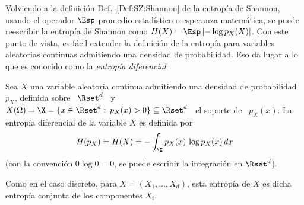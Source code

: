 
\label{Ssec:SZ:Diferencial}

Volviendo  a  la  definici\'on  Def.~\ref{Def:SZ:Shannon} de  la  entrop\'ia  de
Shannon,  usando   el  operador   $\Esp$  promedio  estad\'istico   o  esperanza
matem\'atica,  se  puede  reescribir  la  entrop\'ia de  Shannon  como  $H(X)  =
\Esp\left[ - \log p_X(X) \right]$.  Con este punto de vista, es f\'acil extender
la definici\'on de la  entrop\'ia para variables aleatorias continuas admitiendo
una densidad de  probabilidad.  Eso da lugar  a lo que es conocido  como la {\it
  entrop\'ia diferencial}:

\begin{definicion}\label{Def:SZ:EntropiaDiferencial}
  Sea  $X$   una  variable  aleatoria   continua  admitiendo  una   densidad  de
  probabilidad \ $p_X$, definida sobre \ $\Rset^d$  \ y \ $X(\Omega) = \X = \{ x
  \in  \Rset^d:  \:  p_X(x)  >  0  \}  \subseteq \Rset^d$  \  el  soporte  de  \
  $p_X(x)$. La entrop\'ia diferencial de la variable $X$ es definida por
  \[
  H(p_X) = H(X) = - \int_\X p_X(x) \, \log p_X(x) \, dx
  \]
  (con la  convenci\'on $0 \log  0 = 0$,  se puede escribir la  integraci\'on en
  $\Rset^d$).
\end{definicion}
%
Como en el caso discreto, para $X = (X_1,\ldots,X_d)$, esta entrop\'ia de $X$ es
dicha entrop\'ia conjunta de los componentes $X_i$.

